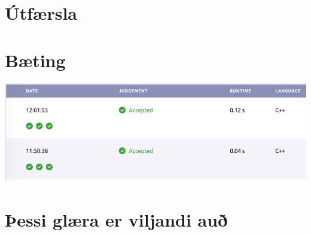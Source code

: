 \section{Útfærsla}
{
}

\section{Bæting}
{
    {
        \includegraphics[scale = 0.35]{fig/ex.png}
    }
}

\section{Þessi glæra er viljandi auð}
{
}


